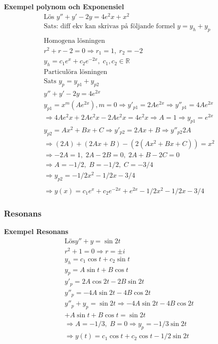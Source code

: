 \begin{multicols}{2}
\textbf{Exempel polynom och Exponensiel}
\begin{align*} %
  &\text{Lös }  y'' + y' -2y = 4e^2x + x^2 \\
  &\text{Sats: diff ekv kan skrivas på följande formel } y=y_h+y_p \\
  &\\
  &\text{Homogena lösningen } \\
  &r^2+r-2=0 \Rightarrow r_1=1, \; r_2=-2 \\
  &y_h=c_1e^x+c_2e^{-2x}, \; c_1,c_2\in\mathbb{R} \\
  &\text{Particulöra lösningen } \\
  &\text{Sats } y_p = y_{p1} + y_{p2} \\
  &y''+y'-2y=4e^{2x} \\
  &y_{p1}=x^m(Ae^{2x}), m=0 \Rightarrow  y'_{p1} = 2Ae^{2x} \Rightarrow  y''_{p1} = 4Ae^{2x} \\
  &\Rightarrow 4Ae^2x+2Ae^2x-2Ae^2x=4e^2x \Rightarrow A=1 \Rightarrow y_{p1}=e^{2x} \\
  &y_{p2} =  Ax^2+Bx+C \Rightarrow y'_{p2}=2Ax+B \Rightarrow y''_{p2}2A \\
  &\Rightarrow (2A) + (2Ax+B) - (2(Ax^2+Bx+C)) = x^2 \\
  &\Rightarrow -2A=1, \; 2A-2B=0, \; 2A+B-2C=0 \\
  &\Rightarrow A=-1/2, \; B=-1/2, \; C=-3/4 \\
  &\Rightarrow y_{p2}=-1/2x^2-1/2x-3/4 \\
  &\\
  &\Rightarrow y(x)=c_1e^x+c_2e^{-2x}+e^{2x}-1/2x^2-1/2x-3/4
\end{align*}


\subsubsection{Resonans}
\textbf{Exempel Resonans}
\begin{align*}
  &\text{Lös} y''+y=\sin{2t} \\
  &r^2 +1 = 0 \Rightarrow r=\pm i \\
  &y_h=c_1\cos{t}+c_2\sin{t} \\
  &y_p=A\sin{t}+B\cos{t} \\
  &y'_p=2A\cos{2t}-2B\sin{2t} \\
  &y''_p=-4A\sin{2t}-4B\cos{2t} \\
  &y''_p + y_p = \sin{2t} \Rightarrow -4A\sin{2t}-4B\cos{2t} \\
  &+  A\sin{t}+B\cos{t} = \sin{2t} \\
  &\Rightarrow A=-1/3, \; B=0 \Rightarrow y_p =-1/3\sin{2t} \\
  &\Rightarrow y(t) = c_1\cos{t} + c_2\cos{t} -1/2\sin{2t} \\
\end{align*}



\end{multicols}
